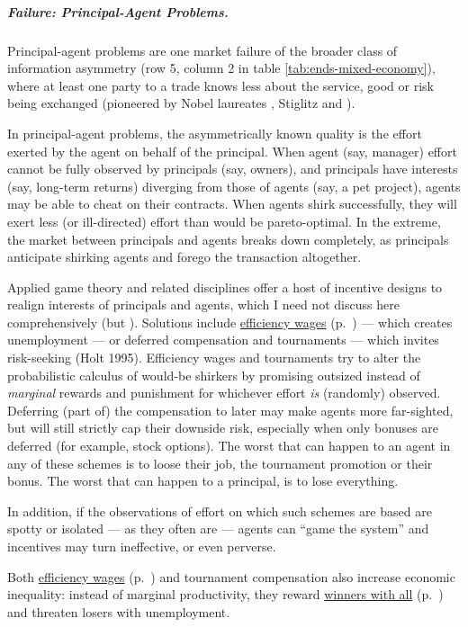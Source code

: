 \subparagraph[Failure: Principal-Agent Problems]{Failure: Principal-Agent Problems.} \label{sec:principal-agent-problem}
Principal-agent problems are one market failure of the broader class of information asymmetry (row 5, column 2 in table \ref{tab:ends-mixed-economy}), where at least one party to a trade knows less about the service, good or risk being exchanged (pioneered by Nobel laureates \citealt{Akerlof-1970-aa}, Stiglitz \citeyear{Stiglitz1976} and \citealt{Spence1974}).

In principal-agent problems, the asymmetrically known quality is the effort exerted by the agent on behalf of the principal.
When agent (say, manager) effort cannot be fully observed by principals (say, owners), and principals have interests (say, long-term returns) diverging from those of agents (say, a pet project), agents may be able to cheat on their contracts. When agents shirk successfully, they will exert less (or ill-directed) effort than would be pareto-optimal.
In the extreme, the market between principals and agents breaks down completely, as principals anticipate shirking agents and forego the transaction altogether.

Applied game theory and related disciplines offer a host of incentive designs to realign interests of principals and agents, which I need not discuss here comprehensively (but \citealt{Tirole2006}).
Solutions include \hyperref[sec:efficiencywages]{efficiency wages} (p.~\pageref{sec:efficiencywages}) --- which creates unemployment --- or deferred compensation and tournaments --- which invites risk-seeking (Holt 1995).
Efficiency wages and tournaments try to alter the probabilistic calculus of would-be shirkers by promising outsized instead of \emph{marginal} rewards and punishment for whichever effort \emph{is} (randomly) observed.
Deferring (part of) the compensation to later may make agents more far-sighted, but will still strictly cap their downside risk, especially when only bonuses are deferred (for example, stock options).
The worst that can happen to an agent in any of these schemes is to loose their job, the tournament promotion or their bonus.
The worst that can happen to a principal, is to lose everything.

In addition, if the observations of effort on which such schemes are based are spotty or isolated --- as they often are --- agents can ``game the system'' and incentives may turn ineffective, or even perverse.

Both \hyperref[sec:efficiencywages]{efficiency wages} (p.~\pageref{sec:efficiencywages}) and tournament compensation also increase economic inequality:
instead of marginal productivity, they reward \hyperref[sec:winner-take-all]{winners with all} (p.~\pageref{sec:winner-take-all}) and threaten losers with unemployment.

